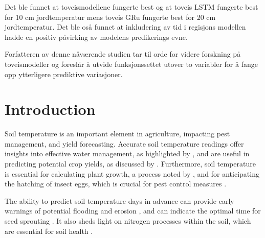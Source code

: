 Det ble funnet at toveismodellene fungerte best og at toveis LSTM fungerte best for 10 cm jordtemperatur mens toveis GRu fungerte best for 20 cm jordtemperatur. Det ble oså funnet at inkludering av tid i regisjons modellen hadde en positiv påvirking av modelens predikerings evne.

Forfatteren av denne nåværende studien tar til orde for videre forskning på toveismodeller og foreslår å utvide funksjonssettet utover to variabler for å fange opp ytterligere prediktive variasjoner.






\section{Introduction}

Soil temperature is an important element in agriculture, impacting pest management, and yield forecasting. Accurate soil temperature readings offer insights into effective water management, as highlighted by \cite{alizamir_advanced_2020}, and are useful in predicting potential crop yields, as discussed by \cite{sim_prediction_2020}. Furthermore, soil temperature is essential for calculating plant growth, a process noted by \cite{li_modeling_2020}, and for anticipating the hatching of insect eggs, which is crucial for pest control measures \cite{nanushi_pest_2022,johnson_effects_2010}.

The ability to predict soil temperature days in advance can provide early warnings of potential flooding and erosion \cite{stuurop_influence_2022}, and can indicate the optimal time for seed sprouting \cite{li_modeling_2020}. It also sheds light on nitrogen processes within the soil, which are essential for soil health \cite{rankinen_simple_2004}.

